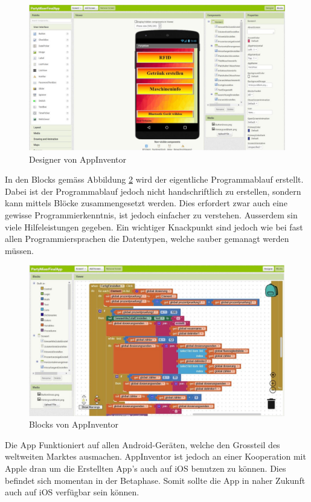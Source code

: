 \begin{figure}[h!]
	\centering
	\includegraphics[width=\textwidth]{graphics/AppInventorDesigner}
	\caption{Designer von AppInventor \cite{appinventor_mit_nodate}}
	\label{fig:AppInventorDesigner}
\end{figure}

In den Blocks gemäss Abbildung \ref{fig:AppInventorBlocks} wird der eigentliche Programmablauf erstellt. Dabei ist der Programmablauf jedoch nicht handschriftlich zu erstellen, sondern kann mittels Blöcke zusammengesetzt werden. Dies erfordert zwar auch eine gewisse Programmierkenntnis, ist jedoch einfacher zu verstehen. Ausserdem sin viele Hilfeleistungen gegeben. Ein wichtiger Knackpunkt sind jedoch wie bei fast allen Programmiersprachen die Datentypen, welche sauber gemanagt werden müssen.

\begin{figure}[h!]
	\centering
	\includegraphics[width=\textwidth]{graphics/AppInventorBlocks}
	\caption{Blocks von AppInventor \cite{appinventor_mit_nodate}}
	\label{fig:AppInventorBlocks}
\end{figure}

Die App Funktioniert auf allen Android-Geräten, welche den Grossteil des weltweiten Marktes ausmachen. AppInventor ist jedoch an einer Kooperation mit Apple dran um die Erstellten App's auch auf iOS benutzen zu können. Dies befindet sich momentan in der Betaphase. Somit sollte die App in naher Zukunft auch auf iOS verfügbar sein können. \cite{appinventor_mit_nodate-1}




 
